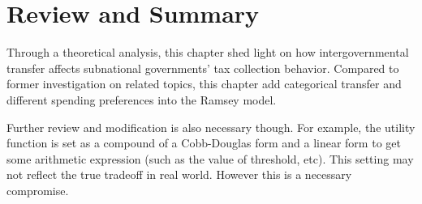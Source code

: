 


\section{Review and Summary}

Through a theoretical analysis, this chapter shed light on how intergovernmental transfer affects subnational governments' tax collection behavior. Compared to former investigation on related topics, this chapter add categorical transfer and different spending preferences into the Ramsey model.

Further review and modification is also necessary though. For example, the utility function is set as a compound of a Cobb-Douglas form and a linear form to get some arithmetic expression (such as the value of threshold, etc). This setting may not reflect the true tradeoff in real world. However this is a necessary compromise.